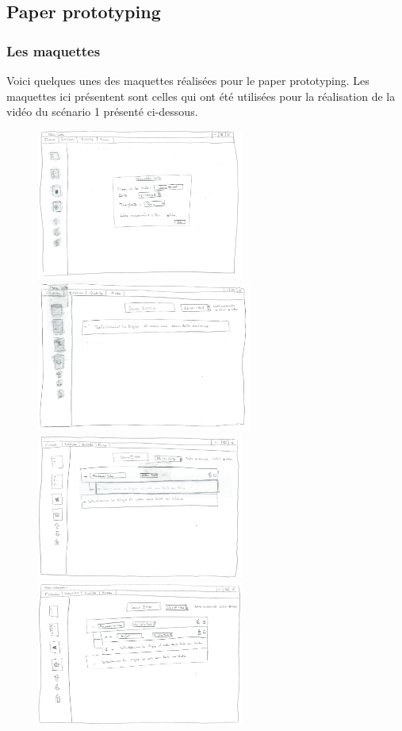\documentclass[a4paper,10pt]{article}
\begin{document}
\subsection{Paper prototyping}

\subsubsection{Les maquettes}
Voici quelques unes des maquettes réalisées pour le paper prototyping. Les maquettes
ici présentent sont celles qui ont été utilisées pour la réalisation de la vidéo du scénario 1 présenté ci-dessous.
\begin{figure}[H]
    \center
    \includegraphics[width=6.8cm]{Images/maquette1.jpeg}
    \includegraphics[width=7.1cm]{Images/maquette2.jpeg}
    \includegraphics[width=6.8cm]{Images/maquette3.jpeg}
    \includegraphics[width=6.8cm]{Images/maquette4.jpeg}

\end{figure}
\end{document}
